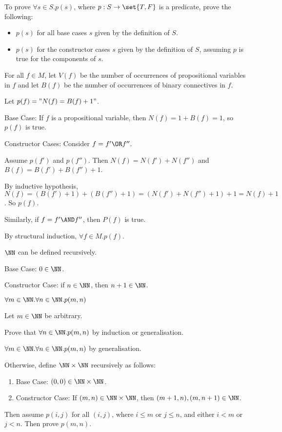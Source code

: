 \documentclass[11pt]{scrartcl}
\begin{document}
To prove $\forall s \in S. p(s)$, where $p: S\to \set{T, F}$ is a predicate, prove the following:
\begin{itemize}
\item $p(s)$ for all base cases $s$ given by the definition of $S$.
\item $p(s)$ for the constructor cases $s$ given by the definition of $S$, assuming $p$ is true for the components of $s$.
\end{itemize}
\begin{example}
For all $f\in M$, let $V(f)$ be the number of occurrences of propositional variables in $f$ and let $B(f)$ be the number of occurrences of binary connectives in $f$.

Let $p(f)="N(f) = B(f) + 1"$.

Base Case: If $f$ is a propositional variable, then $N(f) = 1 +B(f) = 1$, so $p(f)$ is true.

Constructor Cases: Consider $f = f'\OR f''$.

Assume $p(f')$ and $p(f'')$. Then $N(f) = N(f') + N(f'')$ and $B(f) = B(f') +B(f'') + 1$.

By inductive hypothesis, $N(f) = (B(f') + 1) + (B(f'') + 1) = (N(f')+N(f'')+1) + 1 = N(f) +1$. So $p(f)$.

Similarly, if $f = f' \AND f''$, then $P(f)$ is true.

By structural induction, $\forall f\in M. p(f)$.
\end{example}
\begin{example}

  $\NN$ can be defined recursively.

  Base Case: $0\in \NN$.

  Constructor Case: if $n\in \NN$, then $n+1\in \NN$.

  $\forall m \in \NN. \forall n \in \NN.p(m, n)$

  Let $m\in \NN$ be arbitrary.

  Prove that $\forall n\in\NN. p(m, n)$ by induction or generalisation.

  $\forall m\in\NN.\forall n\in\NN.p(m, n)$ by generalisation.

  Otherwise, define $\NN\times \NN$ recursively as follows:
  
\begin{enumerate}
\item\label{item:2} Base Case: $(0, 0) \in \NN\times\NN$.
\item Constructor Case: If $(m,n)\in \NN\times\NN$, then $(m+1, n), (m, n+1)\in \NN$.
\end{enumerate}

Then assume $p(i, j)$ for all $(i, j)$, where $i\leq m$ or $j\leq n$, and either $i< m$ or $j <n$. Then prove $p(m, n)$.

\end{example}
\end{document}
